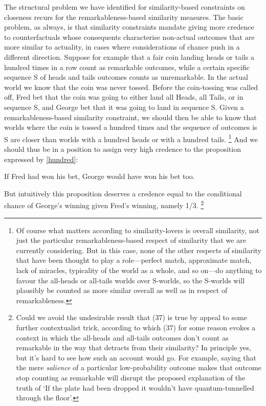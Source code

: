 \documentclass[If.tex]{subfiles}
\begin{document}
The structural problem we have identified for similarity-based constraints on closeness recurs for the remarkableness-based similarity measures. The basic problem, as always, is that similarity constraints mandate giving more credence to counterfactuals whose consequents characterise non-actual outcomes that are more similar to actuality, in cases where considerations of chance push in a different direction. Suppose for example that a fair coin landing heads or tails a hundred times in a row count as remarkable outcomes, while a certain specific sequence S of heads and tails outcomes counts as unremarkable. In the actual world we know that the coin was never tossed. Before the coin-tossing was called off, Fred bet that the coin was going to either land all Heads, all Tails, or in sequence S, and George bet that it was going to land in sequence S. Given a remarkableness-based similarity constraint, we should then be able to know that worlds where the coin is tossed a hundred times and the sequence of outcomes is S are closer than worlds with a hundred heads or with a hundred tails.%
\footnote{Of course what matters according to similarity-lovers is overall similarity, not just the particular remarkableness-based respect of similarity that we are currently considering. But in this case, none of the other respects of similarity that have been thought to play a role---perfect match, approximate match, lack of miracles, typicality of the world as a whole, and so on---do anything to favour the all-heads or all-tails worlds over S-worlds, so the S-worlds will plausibly be counted as more similar overall as well as in respect of remarkableness.} 
And we should thus be in a position to assign very high credence to the proposition expressed by \ref{hundred}:
\begin{prop}
\nitem \label{hundred}
  If Fred had won his bet, George would have won his bet too.
\end{prop}
But intuitively this proposition deserves a credence equal to the conditional chance of George's winning given Fred's winning, namely 1/3.%
\footnote{Could we avoid the undesirable result that (37) is true by appeal to some further contextualist trick, according to which (37) for some reason evokes a context in which the all-heads and all-tails outcomes don't count as remarkable in the way that detracts from their similarity? In principle yes, but it's hard to see how such an account would go. For example, saying that the mere \emph{salience} of a particular low-probability outcome makes that outcome stop counting as remarkable will disrupt the proposed explanation of the truth of `If the plate had been dropped it wouldn't have quantum-tunnelled through the floor'.}
\end{document}
